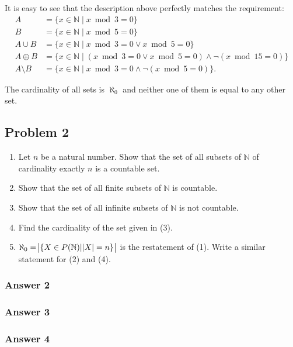 \documentclass[11pt]{article}
\begin{document}
It is easy to see that the description above perfectly matches the requirement:
\begin{equation*}
  \begin{aligned}
    A             &= \{x \in \mathbb{N} \; | \; x \bmod 3 = 0\} \\
    B             &= \{x \in \mathbb{N} \; | \; x \bmod 5 = 0\} \\
    A \cup B      &= \{x \in \mathbb{N} \; | \; x \bmod 3 = 0 \lor x \bmod 5 = 0\} \\
    A \oplus B    &= \{x \in \mathbb{N} \; | \; (x \bmod 3 = 0 \lor x \bmod 5 = 0)
                      \land \lnot (x \bmod 15 = 0)\} \\
    A \setminus B &= \{x \in \mathbb{N} \; | \; x \bmod 3 = 0 \land \lnot (x \bmod 5 = 0)\}.
  \end{aligned}
\end{equation*}

The cardinality of all sets is $\aleph_0$ and neither one of them is equal to any
other set.
\subsection{Problem 2}
\label{sec-1-2}
\begin{enumerate}
\item Let $n$ be a natural number. Show that the set of all subsets of $\mathbb{N}$ of
cardinality exactly $n$ is a countable set.
\item Show that the set of all finite subsets of $\mathbb{N}$ is countable.
\item Show that the set of all infinite subsets of $\mathbb{N}$ is not countable.
\item Find the cardinality of the set given in (3).
\item $\aleph_0 = \abs{\{X \in P(\mathbb{N}) | \abs{X} = n\}}$ is the restatement of (1).
Write a similar statement for (2) and (4).
\end{enumerate}

\subsubsection{Answer 2}
\label{sec-1-2-1}

\subsubsection{Answer 3}
\label{sec-1-2-2}

\subsubsection{Answer 4}
\label{sec-1-2-3}
\end{document}
